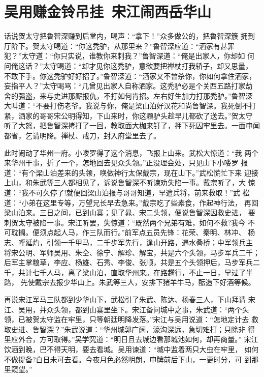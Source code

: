 \chapter{吴用赚金铃吊挂~宋江闹西岳华山}

话说贺太守把鲁智深赚到后堂内，喝声：“拿下！”众多做公的，把鲁智深簇
拥到厅阶下。贺太守喝道：“你这秃驴，从那里来？”鲁智深应道：“洒家有甚罪
犯？”太守道：“你只实说，谁教你来刺我？”鲁智深道：“俺是出家人，你却如
何问俺这话？”太守喝道：“却才见你这秃驴，意欲要把禅杖打我轿子，却又思量，
不敢下手。你这秃驴好好招了。”鲁智深道：“洒家又不曾杀你，你如何拿住洒家，
妄指平人？”太守喝骂：“几曾见出家人自称洒家。这秃驴必是个关西五路打家劫
舍的强盗，来与史进那厮报仇，不打如何肯招。左右好生加力打那秃驴。”鲁智深
大叫道：“不要打伤老爷。我说与你，俺是梁山泊好汉花和尚鲁智深。我死倒不打
紧，洒家的哥哥宋公明得知，下山来时，你这颗驴头趁早儿都砍了送去。”贺太守
听了大怒，把鲁智深拷打了一回，教取面大枷来钉了，押下死囚牢里去。一面申闻
都省，乞请明降。禅杖、戒刀，封入府堂里去了。

此时闹动了华州一府。小喽罗得了这个消息，飞报上山来。武松大惊道：“我
两个来华州干事，折了一个，怎地回去见众头领。”正没理会处，只见山下小喽罗
报道：“有个梁山泊差来的头领，唤做神行太保戴宗，现在山下。”武松慌忙下来
迎接上山，和朱武等三人都相见了，诉说鲁智深不听谏劝失陷一事。戴宗听了，大
惊道：“我不可久停了!就便回梁山泊报与哥哥知道，早遣兵将，前来救取！”武
松道：“小弟在这里专等，万望兄长早去急来。”戴宗吃了些素食，作起神行法，
再回梁山泊来。三日之间，已到山寨；见了晁、宋二头领，便说鲁智深因救史进，
要刺贺太守被陷一事。宋江听罢，失惊道：“既然两个兄弟有难，如何不救?我今
不可耽搁。便须点起人马，作三队而行。”前军点五员先锋：花荣、秦明、林冲、
杨志、呼延灼，引领一千甲马，二千步军先行，逢山开路，遇水叠桥；中军领兵主
将宋公明、军师吴用、朱仝、徐宁、解珍、解宝，共是六个头领，马步军兵二千；
后军主掌粮草，李应、杨雄、石秀、李俊、张顺，共是五个头领押后，马步军兵二
千，共计七千人马，离了梁山泊，直取华州来。在路趱行，不止一日，早过了半路，
先使戴宗去报少华山上。朱武等三人，安排下猪羊牛马，酝造下好酒等候。

再说宋江军马三队都到少华山下，武松引了朱武、陈达、杨春三人，下山拜请
宋江、吴用，并众头领，都到山寨里坐下。宋江备问城中之事，朱武道：“两个头
领，已被贺太守监在牢里，只等朝廷明降发落。”宋江与吴用说道：“怎地定计去
救取史进、鲁智深？”朱武说道：“华州城郭广阔，濠沟深远，急切难打；只除非
得里应外合，方可取得。”吴学究道：“明日且去城边看那城池如何，却再商量。”
宋江饮酒到晚，巴不得天明，要去看城。吴用谏道：“城中监着两只大虫在牢里，
如何不做提备?白日未可去看。今夜月色必然明朗，申牌前后下山，一更时分，可
到那里窥望。”

